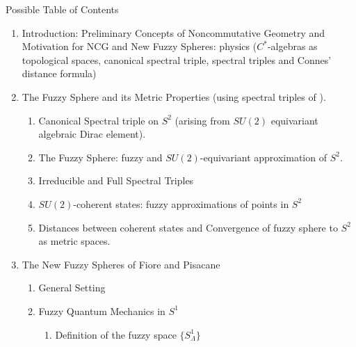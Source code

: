 \begin{frame}{Possible Table of Contents}
    \tiny
    \begin{enumerate}
    
    \item Introduction: Preliminary Concepts of Noncommutative Geometry and Motivation for NCG and New Fuzzy Spheres: physics ($C^*$-algebras as topological spaces, canonical spectral triple, spectral triples and Connes' distance formula)
    
    \item The Fuzzy Sphere and its Metric Properties (using spectral triples of \cite{DAndrea2013}).
    
        \begin{enumerate}
        \tiny
        
        \item Canonical Spectral triple on $S^2$ (arising from $SU(2)$ equivariant algebraic Dirac element).
        
        \item The Fuzzy Sphere: fuzzy and $SU(2)$-equivariant approximation of $S^2$.
        
        \item Irreducible and Full Spectral Triples
        
        \item $SU(2)$-coherent states: fuzzy approximations of points in $S^2$
        
        \item Distances between coherent states and Convergence of fuzzy sphere to $S^2$ as metric spaces.
        
        \end{enumerate}
    
    \item The New Fuzzy Spheres of Fiore and Pisacane
    
        \begin{enumerate}
        \tiny
        
        \item General Setting
        
        \item Fuzzy Quantum Mechanics in $S^1$
        
            \begin{enumerate}\tiny
                
            \item Definition of the fuzzy space $\{S^1_\Lambda\}$
            

\end{enumerate}
\end{enumerate}
\end{enumerate}
\end{frame}
